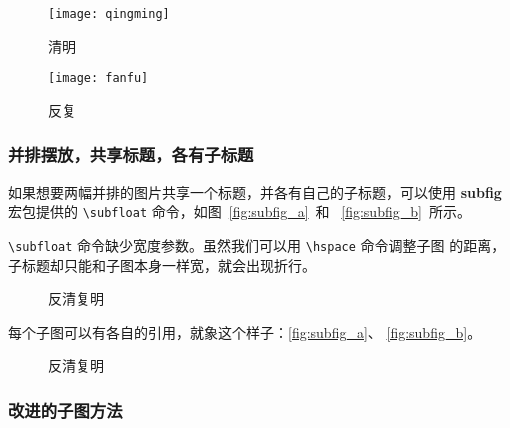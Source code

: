 \begin{figure}[htbp]
\centering
\begin{minipage}[t]{0.3\textwidth}
    \centering
    \texttt{[image: qingming]}
    \caption{清明}
    \label{fig:qingming}
\end{minipage}
\hspace{36pt}
\begin{minipage}[t]{0.3\textwidth}
    \centering
    \texttt{[image: fanfu]}
    \caption{反复}
    \label{fig:fanfu}
\end{minipage}
\end{figure}

\subsubsection*{并排摆放，共享标题，各有子标题}

如果想要两幅并排的图片共享一个标题，并各有自己的子标题，可以使用
\textbf{subfig} 宏包提供的 \verb|\subfloat| 命令，如图~\ref{fig:subfig_a}~和
~\ref{fig:subfig_b}~所示。

\verb|\subfloat| 命令缺少宽度参数。虽然我们可以用 \verb|\hspace| 命令调整子图
的距离，子标题却只能和子图本身一样宽，就会出现折行。

\begin{code}
\begin{figure}[htbp]
\centering
{}
\hspace{36pt}
\caption{反清复明}
\end{figure}
\end{code}

每个子图可以有各自的引用，就象这个样子：\ref{fig:subfig_a}、
\ref{fig:subfig_b}。

\begin{figure}[htbp]
\centering
{}
\hspace{36pt}
\caption{反清复明}
\end{figure}

\subsubsection*{改进的子图方法}

